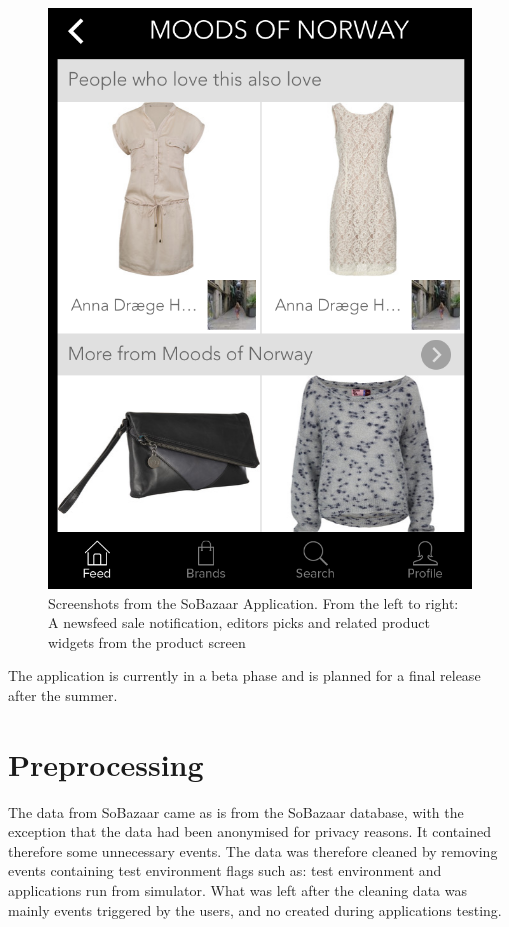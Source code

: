 \begin{figure}[H]
\begin{minipage}{.3\linewidth}
			  \includegraphics[height=1.5\linewidth]{image/SoBazaarrelated.png}
		\end{minipage}
		\caption[SoBazaar screenshots - version 0.5.1]{Screenshots from the SoBazaar Application. From the left to right: A newsfeed sale notification, editors picks and related product widgets from the product screen}
		\label{figure:SoBazaarfeed}
	\end{figure}

	The application is currently in a beta phase and is planned for a final release after the summer.


\section{Preprocessing}
    The data from SoBazaar came as is from the SoBazaar database, with the exception that the data had been anonymised for privacy reasons.
    It contained therefore some unnecessary events.
    The data was therefore cleaned by removing events containing test environment flags such as: test environment and applications run from simulator.
    What was left after the cleaning data was mainly events triggered by the users, and no created during applications testing.

